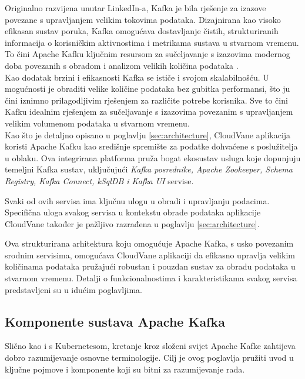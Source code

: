 \documentclass[times, utf8, diplomski]{fer}
\begin{document}
Originalno razvijena unutar LinkedIn-a, Kafka je bila rješenje za izazove povezane s upravljanjem velikim tokovima podataka. Dizajnirana kao visoko efikasan sustav poruka, Kafka omogućava dostavljanje čistih, strukturiranih informacija o korisničkim aktivnostima i metrikama sustava u stvarnom vremenu. To čini Apache Kafku ključnim resursom za sučeljavanje s izazovima modernog doba povezanih s obradom i analizom velikih količina podataka \citep{shapira_kafka_2021}.\\

Kao dodatak brzini i efikasnosti Kafka se ističe i svojom skalabilnošću. U mogućnosti je obraditi velike količine podataka bez gubitka performansi, što ju čini iznimno prilagodljivim rješenjem za različite potrebe korisnika. Sve to čini Kafku idealnim rješenjem za sučeljavanje s izazovima povezanim s upravljanjem velikim volumenom podataka u stvarnom vremenu. \\

Kao što je detaljno opisano u poglavlju \ref{sec:architecture}, CloudVane aplikacija koristi Apache Kafku kao središnje spremište za podatke dohvaćene s poslužitelja u oblaku. Ova integrirana platforma pruža bogat ekosustav usluga koje dopunjuju temeljni Kafka sustav, uključujući \emph{Kafka posrednike, Apache Zookeeper, Schema Registry, Kafka Connect, kSqlDB i Kafka UI} servise.

Svaki od ovih servisa ima ključnu ulogu u obradi i upravljanju podacima. Specifična uloga svakog servisa u kontekstu obrade podataka aplikacije CloudVane također je pažljivo razrađena u poglavlju \ref{sec:architecture}.

Ova strukturirana arhitektura koju omogućuje Apache Kafka, s usko povezanim srodnim servisima, omogućava CloudVane aplikaciji da efikasno upravlja velikim količinama podataka pružajući robustan i pouzdan sustav za obradu podataka u stvarnom vremenu.
Detalji o funkcionalnostima i karakteristikama svakog servisa predstavljeni su u idućim poglavljima.

\subsection{Komponente sustava Apache Kafka}

Slično kao i s Kubernetesom, kretanje kroz složeni svijet Apache Kafke zahtijeva dobro razumijevanje osnovne terminologije. Cilj je ovog poglavlja pružiti uvod u ključne pojmove i komponente koji su bitni za razumijevanje rada.\\
\end{document}
